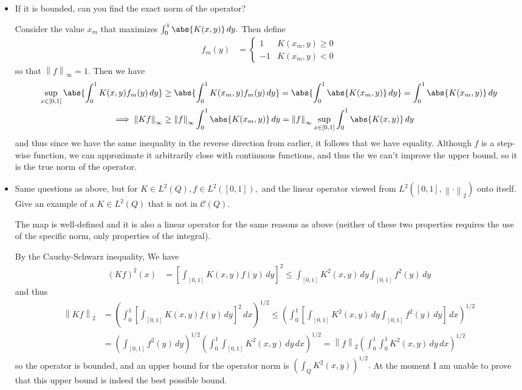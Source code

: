 \documentclass{article}
\begin{document}
\begin{itemize}
	\item If it is bounded, can you find the exact norm of the operator?
		\begin{answer*}
			Consider the value $x_m$ that maximizes $\int_0^1 \abs{K(x, y)}\, dy.$ Then define
			\begin{align*}
				f_m(y) &= \begin{cases}
					1 & K(x_m, y)\ge 0 \\
					-1 & K(x_m, y)<0
				\end{cases}
			\end{align*}
			so that $\left\lVert f \right\rVert_\infty = 1.$ Then we have
			\begin{align*}
				\sup_{x\in[0, 1]} \abs{\int_0^1 K(x, y)f_m(y)\, dy} &\ge \abs{\int_0^1 K(x_m, y)f_m(y)\, dy} = \abs{\int_0^1 \abs{K(x_m, y)}\, dy} = \int_0^1\abs{K(x_m, y)}\, dy \\
				\implies \left\lVert Kf \right\rVert_\infty &\ge \left\lVert f \right\rVert_\infty \int_0^1 \abs{K(x_m, y)}\, dy = \left\lVert f \right\rVert_\infty \sup_{x\in[0, 1]}\int_0^1 \abs{K(x, y)}\, dy
			\end{align*}
			and thus since we have the same inequality in the reverse direction from earlier, it follows that we have equality. Although $f$ is a step-wise function, we can approximate it arbitrarily close with continuous functions, and thus the we can't improve the upper bound, so it is the true norm of the operator.
		\end{answer*}

	\item Same questions as above, but for $K\in L^2(Q), f\in L^2([0, 1]),$ and the linear operator viewed from $L^2\left( [0, 1], \left\lVert \cdot \right\rVert_2 \right)$ onto itself. Give an example of a $K\in L^2(Q)$ that is not in $\mathcal{C}(Q).$
		\begin{soln}
			The map is well-defined and it is also a linear operator for the same reasons as above (neither of these two properties requires the use of the specific norm, only properties of the integral).

			By the Cauchy-Schwarz inequality, We have
			\begin{align*}
				(Kf)^2(x) &= \left[ \int_{[0, 1]} K(x, y) f(y)\, dy \right]^2 \le \int_{[0, 1]} K^2(x, y)\, dy \int_{[0, 1]} f^2(y)\, dy
			\end{align*}
			and thus
			\begin{align*}
				\left\lVert Kf \right\rVert_2 &= \left( \int_0^1 \left[ \int_{[0, 1]} K(x, y)f(y)\, dy \right]^2 \, dx\right)^{1/2} \le \left( \int_0^1 \left[ \int_{[0, 1]} K^2(x, y)\, dy \int_{[0, 1]} f^2(y)\, dy \right]\, dx \right)^{1/2} \\
				&= \left( \int_{[0, 1]} f^2(y)\, dy \right)^{1/2} \left( \int_0^1 \int_{[0, 1]} K^2(x, y)\, dy\, dx \right)^{1/2} = \left\lVert f \right\rVert_2 \left( \int_0^1 \int_0^1 K^2(x, y)\, dy\, dx \right)^{1/2}
			\end{align*}
			so the operator is bounded, and an upper bound for the operator norm is $\left(\int_{Q} K^2(x, y)\right)^{1/2}.$ At the moment I am unable to prove that this upper bound is indeed the best possible bound.


\end{soln}
\end{itemize}
\end{document}
